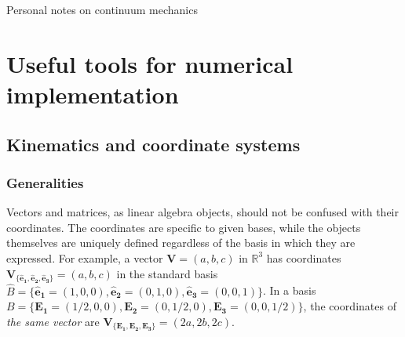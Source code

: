 \documentclass[letterpaper,12pt,oneside]{report}
\begin{document}
\begin{center}
Personal notes on continuum mechanics
\end{center}

\chapter{Useful tools for numerical implementation}
\section{Kinematics and coordinate systems}
\subsection{Generalities}

Vectors and matrices, as linear algebra objects, should not be confused with their coordinates. The coordinates are specific to given bases, while the objects themselves are uniquely defined regardless of the basis in which they are expressed. For example, a vector $\mathbf{V}=(a,b,c)$ in $\mathbb{R}^3$ has coordinates $\mathbf{V}_{\{\mathbf{\hat{e}_1},\mathbf{\hat{e}_2},\mathbf{\hat{e}_3}\}} = (a,b,c)$ in the standard basis $\hat{B}=\{\mathbf{\hat{e}_1} =(1,0,0),\mathbf{\hat{e}_2} =(0,1,0),\mathbf{\hat{e}_3} =(0,0,1)\}$. In a basis $B=\{\mathbf{E_1} =(1/2,0,0),\mathbf{E_2} =(0,1/2,0),\mathbf{E_3} =(0,0,1/2)\}$, the coordinates of \emph{the same vector} are $\mathbf{V}_{\{\mathbf{E_1},\mathbf{E_2},\mathbf{E_3}\}} = (2a,2b,2c)$. 
\end{document}
